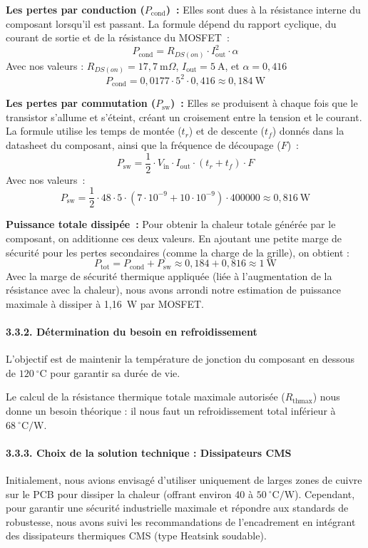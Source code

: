 \textbf{Les pertes par conduction ($P_{\text{cond}}$)~:} Elles sont dues à la résistance interne du composant lorsqu'il est passant. La formule dépend du rapport cyclique, du courant de sortie et de la résistance du MOSFET~:
$$ P_{\text{cond}} = R_{DS(on)} \cdot I_{\text{out}}^2 \cdot \alpha $$
Avec nos valeurs : $R_{DS(on)} = 17,7~\text{m}\Omega$, $I_{\text{out}} = 5~\text{A}$, et $\alpha = 0,416$
$$ P_{\text{cond}} = 0,0177 \cdot 5^2 \cdot 0,416 \approx 0,184~\text{W} $$

\textbf{Les pertes par commutation ($P_{\text{sw}}$)~:} Elles se produisent à chaque fois que le transistor s'allume et s'éteint, créant un croisement entre la tension et le courant. La formule utilise les temps de montée ($t_r$) et de descente ($t_f$) donnés dans la datasheet du composant, ainsi que la fréquence de découpage ($F$)~:
$$ P_{\text{sw}} = \frac{1}{2} \cdot V_{\text{in}} \cdot I_{\text{out}} \cdot (t_r + t_f) \cdot F $$
Avec nos valeurs~:
$$ P_{\text{sw}} = \frac{1}{2} \cdot 48 \cdot 5 \cdot (7\cdot 10^{-9} + 10 \cdot 10^{-9}) \cdot 400000 \approx 0,816~\text{W} $$

\textbf{Puissance totale dissipée~:} Pour obtenir la chaleur totale générée par le composant, on additionne ces deux valeurs. En ajoutant une petite marge de sécurité pour les pertes secondaires (comme la charge de la grille), on obtient :
$$ P_{\text{tot}} = P_{\text{cond}} + P_{\text{sw}} \approx 0,184 + 0,816 \approx 1~\text{W} $$
Avec la marge de sécurité thermique appliquée (liée à l'augmentation de la résistance avec la chaleur), nous avons arrondi notre estimation de puissance maximale à dissiper à 1,16~W par MOSFET.

\paragraph{3.3.2. Détermination du besoin en refroidissement}
L'objectif est de maintenir la température de jonction du composant en dessous de $120~^\circ\text{C}$ pour garantir sa durée de vie.

Le calcul de la résistance thermique totale maximale autorisée ($R_{\text{thmax}}$) nous donne un besoin théorique : il nous faut un refroidissement total inférieur à $68~^\circ\text{C/W}$.

\paragraph{3.3.3. Choix de la solution technique : Dissipateurs CMS}
Initialement, nous avions envisagé d'utiliser uniquement de larges zones de cuivre sur le PCB pour dissiper la chaleur (offrant environ 40 à $50~^\circ\text{C/W}$). Cependant, pour garantir une sécurité industrielle maximale et répondre aux standards de robustesse, nous avons suivi les recommandations de l'encadrement en intégrant des dissipateurs thermiques CMS (type Heatsink soudable).

